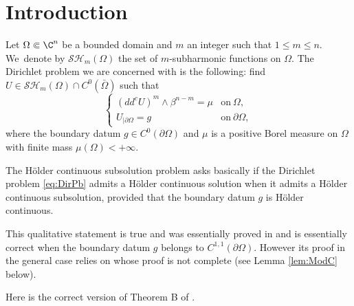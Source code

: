 \section{Introduction}
Let $\Omega \Subset \C^n$ be a bounded domain and $m$ an integer such that $1 \leq m \leq n$. We~deno\-te by $\mathcal{SH}_m (\Omega)$ the set of $m$-subharmonic functions on $\Omega$. The Dirichlet problem we are concerned with is the following: find $U \in \mathcal{SH}_m (\Omega) \cap C^0 (\bar{\Omega})$ such that
\begin{equation}\label{eq:DirPb}
\begin{cases}
(dd^c U)^m \wedge \beta^{n - m} = \mu &\text{on}\ \Omega, \\
U_{\mid \partial \Omega} = g & \text{on}\ \partial \Omega,
\end{cases}
\end{equation}
where the boundary datum $g \in C^0 (\partial \Omega)$ and $\mu$ is a positive Borel measure on $\Omega$ with finite mass $\mu (\Omega) < + \infty$.

The Hölder continuous subsolution problem asks basically if the Dirichlet problem \eqref{eq:DirPb} admits a Hölder continuous solution when it admits a Hölder continuous subsolution, provided that the boundary datum $g$ is Hölder continuous.

This qualitative statement is true and was essentially proved in \cite[Th.\,B]{BZ20} and is essentially correct when the boundary datum $g$ belongs to $C^{1,1} (\partial \Omega)$. However its proof in the general case relies on \cite[Lem.\,4.2]{BZ20} whose proof is not complete (see Lemma \ref{lem:ModC} below).

Here is the correct version of Theorem B of \cite{BZ20}.

